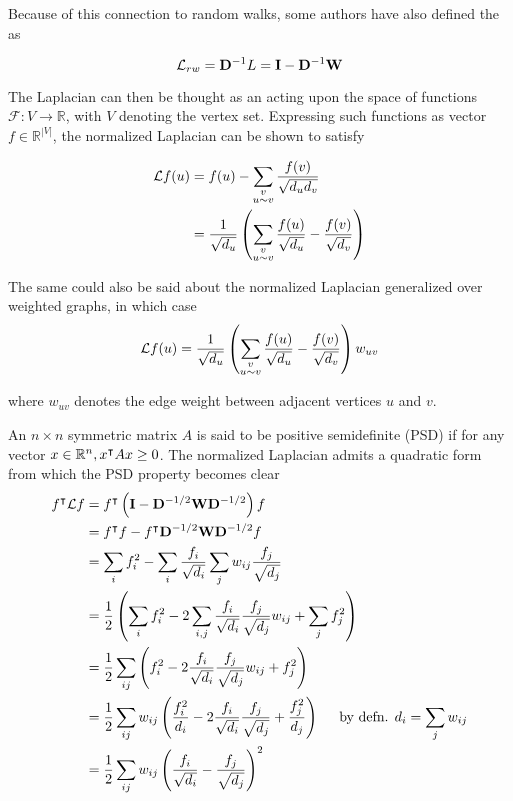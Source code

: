 Because of this connection to random walks, some authors have also defined the  as

\begin{equation}
\mathbf{\mathcal{L}}_{rw} = \mathbf{D}^{-1} L = \mathbf{I} - \mathbf{D}^{-1} \mathbf{W}
\end{equation}

The Laplacian can then be thought as an  acting upon the space of
functions $\mathcal{F} : V \to \mathbb{R}$, with $V$ denoting the vertex set.
Expressing such functions as vector $f \in \mathbb{R}^{|V|}$, the normalized Laplacian
can be shown to satisfy
 
\begin{align}
\mathcal{L}f(u) &= f(u) - \sum_{\substack{ v \\ u \sim v}} \frac{f(v)}{\sqrt{d_ud_v}} \notag \\
 &= \frac{1}{\sqrt{d_u}} \left( \sum_{\substack{ v \\ u \sim v}} \frac{f(u)}{\sqrt{d_u}} - \frac{f(v)}{\sqrt{d_v}} \right)
\label{eq:difference-operator}
\end{align}

The same could also be said about the normalized Laplacian generalized over weighted
graphs, in which case
\begin{equation}
\mathbf{\mathcal{L}} f (u) = \frac{1}{\sqrt{d_u}} \left( \sum_{\substack{ v \\ u \sim v}} \frac{f(u)}{\sqrt{d_u}} - \frac{f(v)}{\sqrt{d_v}} \right) w_{uv}
\end{equation}

where $w_{uv}$ denotes the edge weight between adjacent vertices $u$ and $v$. 

An $n \times  n$ symmetric matrix $A$ is said to be positive semidefinite (PSD) if for any vector $x \in \mathbb{R}^n, x^\intercal A x \geq 0$.  The normalized Laplacian admits a quadratic form from which the PSD property becomes clear
\begin{align}
f^\intercal \mathbf{\mathcal{L}} f &= f^\intercal \left( \mathbf{I} - \mathbf{D}^{-1/2} \mathbf{W} \mathbf{D}^{-1/2} \right) f \notag \\
&= f^\intercal f - f^\intercal \mathbf{D}^{-1/2} \mathbf{W} \mathbf{D}^{-1/2} f \notag \notag \\
&= \sum_{i} f_i^2 - \sum_{i} \frac{f_i}{\sqrt{d_i}} \sum_j w_{ij} \frac{f_j}{\sqrt{d_j}} \notag \\
&= \frac{1}{2} \left( \sum_i f_i^2 - 2 \sum_{i,j} \frac{f_i}{\sqrt{d_i}} \frac{f_j}{\sqrt{d_j}} w_{ij} + \sum_j f_j^2 \right) \notag \\
&= \frac{1}{2} \sum_{ij} \left(  f_i^2 -2\frac{f_i}{\sqrt{d_i}}\frac{f_j}{\sqrt{d_j}} w_{ij}  + f_j^2 \right) \notag \\
&=  \frac{1}{2} \sum_{ij} w_{ij} \left(  \frac{f_i^2}{d_i} -2\frac{f_i}{\sqrt{d_i}}\frac{f_j}{\sqrt{d_j}} + \frac{f_j^2}{d_j} \right) \hspace{5mm} \text{by defn. $d_i = \sum_j w_{ij}$} \notag \\
&= \frac{1}{2} \sum_{ij} w_{ij} \left( \frac{f_i}{\sqrt{d_i}} - \frac{f_j}{\sqrt{d_j}} \right)^2
\label{eq:quadratic-form}
\end{align}

